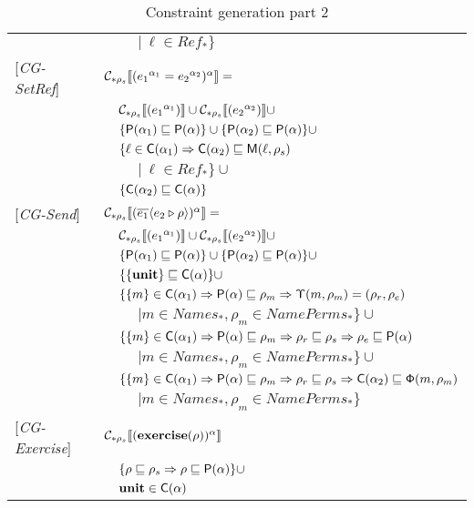 \begin{table}[htb]
\begin{tabular} {l l l l}
&&&$|\ \ell \in Ref_*\}$\\
{[\textit{CG-SetRef}]}&\multicolumn{3}{l}{$\mathcal{C}_{*\rho_s}\llbracket ({e_1}^{\alpha_1} = {e_2}^{\alpha_2})^\alpha \rrbracket = $}\\
&&\multicolumn{2}{l}{$ \mathcal{C}_{*\rho_s}\llbracket ({e_1}^{\alpha_1}) \rrbracket \cup \mathcal{C}_{*\rho_s}\llbracket ({e_2}^{\alpha_2}) \rrbracket \cup $}\\
&&\multicolumn{2}{l}{$ \{ \mathsf{P}(\alpha_1) \sqsubseteq \mathsf{P}(\alpha) \} \cup \{ \mathsf{P}(\alpha_2) \sqsubseteq \mathsf{P}(\alpha) \} \cup $}\\
&&\multicolumn{2}{l}{$\{\ell \in \mathsf{C}(\alpha_1) \Rightarrow \mathsf{C}(\alpha_2) \sqsubseteq \mathsf{M}(\ell, \rho_s)$}\\
&&&$|\ \ell \in Ref_*\}\cup$ \\
&&\multicolumn{2}{l}{$\{ \mathsf{C}(\alpha_2) \sqsubseteq \mathsf{C}(\alpha) \}$} \\
{[\textit{CG-Send}]}&\multicolumn{3}{l}{$\mathcal{C}_{*\rho_s}\llbracket (\overline{e_1} \langle e_2 \triangleright \rho \rangle)^\alpha \rrbracket = $}\\
&&\multicolumn{2}{l}{$ \mathcal{C}_{*\rho_s}\llbracket ({e_1}^{\alpha_1}) \rrbracket \cup \mathcal{C}_{*\rho_s}\llbracket ({e_2}^{\alpha_2}) \rrbracket \cup$}\\
&&\multicolumn{2}{l}{$ \{ \mathsf{P}(\alpha_1) \sqsubseteq \mathsf{P}(\alpha) \} \cup \{ \mathsf{P}(\alpha_2) \sqsubseteq \mathsf{P}(\alpha) \} \cup$}\\
&&\multicolumn{2}{l}{$\{ \{\mathbf{unit}\} \sqsubseteq \mathsf{C}(\alpha) \} \cup$}\\
&&\multicolumn{2}{l}{$ \{ \{m\} \in \mathsf{C}(\alpha_1) \Rightarrow \mathsf{P}(\alpha) \sqsubseteq \rho_m \Rightarrow \mathsf{\Upsilon}(m, \rho_m) = (\rho_r, \rho_e)$}\\
&&&$| m \in Names_*, \rho_m \in NamePerms_*\}\cup$\\
&&\multicolumn{2}{l}{$ \{ \{m\} \in \mathsf{C}(\alpha_1) \Rightarrow \mathsf{P}(\alpha) \sqsubseteq \rho_m \Rightarrow \rho_r \sqsubseteq \rho_s \Rightarrow \rho_e \sqsubseteq \mathsf{P}(\alpha)$}\\
&&&$| m \in Names_*, \rho_m \in NamePerms_*\}\cup$\\
&&\multicolumn{2}{l}{$ \{ \{m\} \in \mathsf{C}(\alpha_1) \Rightarrow \mathsf{P}(\alpha) \sqsubseteq \rho_m \Rightarrow \rho_r \sqsubseteq \rho_s \Rightarrow \mathsf{C}(\alpha_2) \sqsubseteq \mathsf{\Phi}(m, \rho_m)$}\\
&&&$| m \in Names_*, \rho_m \in NamePerms_*\}$\\
{[\textit{CG-Exercise}]}& \multicolumn{3}{l}{$\mathcal{C}_{*\rho_s}\llbracket (\mathbf{exercise}(\rho))^\alpha \rrbracket $}\\
&&\multicolumn{2}{l}{$ \{ \rho \sqsubseteq \rho_s \Rightarrow \rho \sqsubseteq \mathsf{P}(\alpha) \} \cup $}\\
&&\multicolumn{2}{l}{$ \mathbf{unit} \in \mathsf{C}(\alpha)$}\\
\end{tabular}
\caption{Constraint generation part 2}
\label{tab:ConstGen2}
\end{table}

